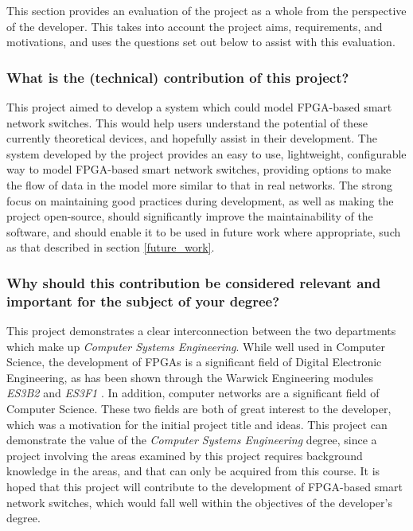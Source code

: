 This section provides an evaluation of the project as a whole from the perspective of the developer. This takes into account the project aims, requirements, and motivations, and uses the questions set out below to assist with this evaluation.


\subsubsection{What is the (technical) contribution of this project?}
This project aimed to develop a system which could model FPGA-based smart network switches. This would help users understand the potential of these currently theoretical devices, and hopefully assist in their development.
The system developed by the project provides an easy to use, lightweight, configurable way to model FPGA-based smart network switches, providing options to make the flow of data in the model more similar to that in real networks.
The strong focus on maintaining good practices during development, as well as making the project open-source, should significantly improve the maintainability of the software, and should enable it to be used in future work where appropriate, such as that described in section \ref{future_work}.

\subsubsection{Why should this contribution be considered relevant and important for the subject of your degree?}
This project demonstrates a clear interconnection between the two departments which make up \textit{Computer Systems Engineering}.
While well used in Computer Science, the development of FPGAs is a significant field of Digital Electronic Engineering, as has been shown through the Warwick Engineering modules \textit{ES3B2} \cite{es3b2} and \textit{ES3F1} \cite{es3f1}.
In addition, computer networks are a significant field of Computer Science.
These two fields are both of great interest to the developer, which was a motivation for the initial project title and ideas.
This project can demonstrate the value of the \textit{Computer Systems Engineering} degree, since a project involving the areas examined by this project requires background knowledge in the areas, and that can only be acquired from this course.
It is hoped that this project will contribute to the development of FPGA-based smart network switches, which would fall well within the objectives of the developer's degree.

